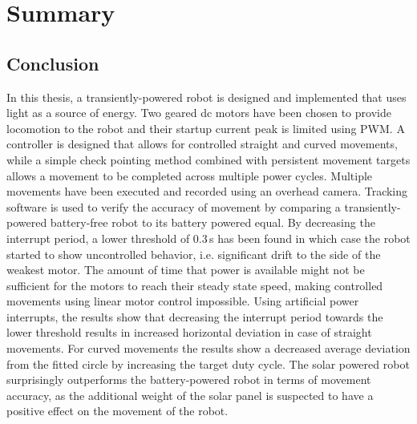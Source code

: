 \chapter{Summary}
\label{chp:summary}


\section{Conclusion}
\label{sec:conclusion}

In this thesis, a transiently-powered robot is designed and implemented that uses light as a source of energy.
Two geared dc motors have been chosen to provide locomotion to the robot and their startup current peak is limited using PWM.
A controller is designed that allows for controlled straight and curved movements, while a simple check pointing method combined with persistent movement targets allows a movement to be completed across multiple power cycles.
Multiple movements have been executed and recorded using an overhead camera.
Tracking software is used to verify the accuracy of movement by comparing a transiently-powered battery-free robot to its battery powered equal.
By decreasing the interrupt period, a lower threshold of 0.3\,s has been found in which case the robot started to show uncontrolled behavior, i.e. significant drift to the side of the weakest motor.
The amount of time that power is available might not be sufficient for the motors to reach their steady state speed, making controlled movements using linear motor control impossible.
Using artificial power interrupts, the results show that decreasing the interrupt period towards the lower threshold results in increased horizontal deviation in case of straight movements.
For curved movements the results show a decreased average deviation from the fitted circle by increasing the target duty cycle.
The solar powered robot surprisingly outperforms the battery-powered robot in terms of movement accuracy, as the additional weight of the solar panel is suspected to have a positive effect on the movement of the robot.


